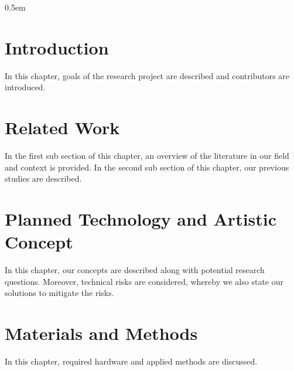 \documentclass[11pt,a4paper,titlepage,final,table]{article}
\begin{document}
\maketitle
\clearpage
{}
\setcounter{page}{2}
\pagestyle{plain}
\parskip 0.5em





{}

\lstset{
	basicstyle=\ttfamily\small,
	keywordstyle=\bfseries,
	language=[Sharp]C
}

\section{Introduction}
In this chapter, goals of the research project are described and contributors are introduced.



\section{Related Work}
In the first sub section of this chapter, an overview of the literature in our field and context is provided.
In the second sub section of this chapter, our previous studies are described.



\section{Planned Technology and Artistic Concept}
In this chapter, our concepts are described along with potential research questions.
Moreover, technical risks are considered, whereby we also state our solutions to mitigate the risks.






\section{Materials and Methods}
In this chapter, required hardware and applied methods are discussed.


\end{document}
